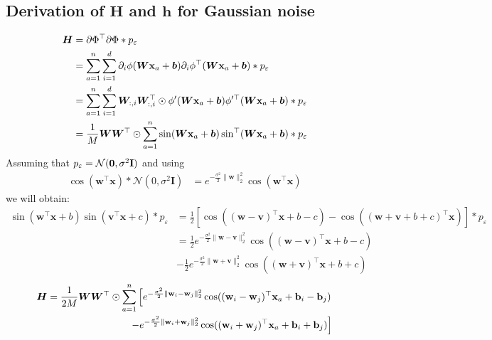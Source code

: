 \subsection{Derivation of \texorpdfstring{${\bm H}$ and ${\bm h}$ for }
 GGaussian noise}
\label{sec:Hh_der}
    \begin{align*}
        {\bm H}
        &= \partial \Phi^{\top}\partial \Phi * p_{\varepsilon}\\
        &= \sum\limits_{a = 1}^n\sum\limits_{i = 1}^d \partial_i \phi(\bm{W}{\bf x}_a + \bm{b})\partial_i \phi^{\top}(\bm{W}{\bf x}_a + \bm{b}) * p_{\varepsilon}\\
        &= \sum\limits_{a = 1}^n\sum\limits_{i = 1}^d \bm{W}_{:, i}\bm{W}_{:, i}^\top \odot \phi'(\bm{W}{\bf x}_a + \bm{b}) \phi'^\top(\bm{W}{\bf x}_a + \bm{b}) * p_{\varepsilon}\\
        &= \frac{1}{M}\bm{W}\bm{W}^{\top} \odot \sum\limits_{a = 1}^n \sin(\bm{W}{\bf x}_a + \bm{b}) \sin^\top(\bm{W}{\bf x}_a + \bm{b}) * p_{\varepsilon}
        \label{eq:H_derivation}
    \end{align*}
    Assuming that $p_{\varepsilon} = {\cal N}({\bf 0}, \sigma^2{\bf I})$ and using
    \begin{align*}
        \cos(\mathbf{w}^\top \mathbf{x}) * \mathcal{N}(0, \sigma^2\mathbf{I}) &=
         e^{-\frac{\sigma^2}{2}\|\mathbf{w}\|_2^2}\cos(\mathbf{w}^\top \mathbf{x})
    \end{align*}
    we will obtain:
    \begin{align*}
        \sin(\mathbf{w^\top x} + b) \sin(\mathbf{v^\top x} + c) * p_{\varepsilon}
        &= \frac{1}{2}\left[\cos ((\mathbf{w - v})^\top \mathbf{x} + b - c) - \cos ((\mathbf{w + v} + b + c)^\top \mathbf{x})\right] * p_{\varepsilon}\\
        &= \frac{1}{2}e^{-\frac{\sigma^2}{2}\|\mathbf{w - v}\|_2^2}\cos ((\mathbf{w - v})^\top \mathbf{x} + b - c)\\
        &- \frac{1}{2}e^{-\frac{\sigma^2}{2}\|\mathbf{w + v}\|_2^2}\cos ((\mathbf{w + v})^\top \mathbf{x} + b + c)
    \end{align*}
    \begin{align}
        {\bm H} = \frac{1}{2M}\bm{W}\bm{W}^{\top} \odot \sum\limits_{a = 1}^n\left[
            e^{-\frac{\sigma^2}{2}\|{\bf w}_i - {\bf w}_j\|_2^2}\cos (({\bf w}_i - {\bf w}_j)^\top \mathbf{x}_a + {\bf b}_i - {\bf b}_j)
            \right .\nonumber \\
            \left .
            - e^{-\frac{\sigma^2}{2}\|{\bf w}_i + {\bf w}_j\|_2^2}\cos (({\bf w}_i + {\bf w}_j)^\top \mathbf{x}_a + {\bf b}_i + {\bf b}_j)
        \right]
    \end{align}
